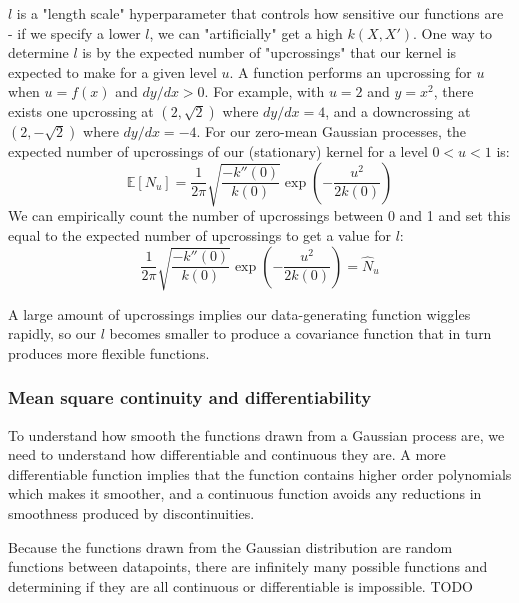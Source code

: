 $l$ is a "length scale" hyperparameter that controls how sensitive our functions are - if we specify a lower $l$, we can "artificially" get a high $k(X,X')$. One way to determine $l$ is by the expected number of "upcrossings" that our kernel is expected to make for a given level $u$. A function performs an upcrossing for $u$ when $u = f(x)$ and $dy/dx > 0$. For example, with $u = 2$ and $y = x^2$, there exists one upcrossing at $(2, \sqrt{2})$ where $dy/dx = 4$, and a downcrossing at $(2, -\sqrt{2})$ where $dy/dx = -4$. For our zero-mean Gaussian processes, the expected number of upcrossings of our (stationary) kernel for a level $ 0 < u < 1$ is:
\begin{equation*}
    \mathbb{E}[N_u] = \frac{1}{2\pi} \sqrt{\frac{-k''(0)}{k(0)}} \exp \left(-\frac{u^2}{2k(0)}\right)
\end{equation*}
We can empirically count the number of upcrossings between 0 and 1 and set this equal to the expected number of upcrossings to get a value for $l$:
\begin{equation} \label{eq:general_l}
    \frac{1}{2\pi} \sqrt{\frac{-k''(0)}{k(0)}} \exp \left(-\frac{u^2}{2k(0)}\right) = \hat{N}_u
\end{equation}

A large amount of upcrossings implies our data-generating function wiggles rapidly, so our $l$ becomes smaller to produce a covariance function that in turn produces more flexible functions.

\subsubsection{Mean square continuity and differentiability}
To understand how smooth the functions drawn from a Gaussian process are, we need to understand how differentiable and continuous they are. A more differentiable function implies that the function contains higher order polynomials which makes it smoother, and a continuous function avoids any reductions in smoothness produced by discontinuities.

Because the functions drawn from the Gaussian distribution are random functions between datapoints, there are infinitely many possible functions and determining if they are all continuous or differentiable is impossible. TODO 



